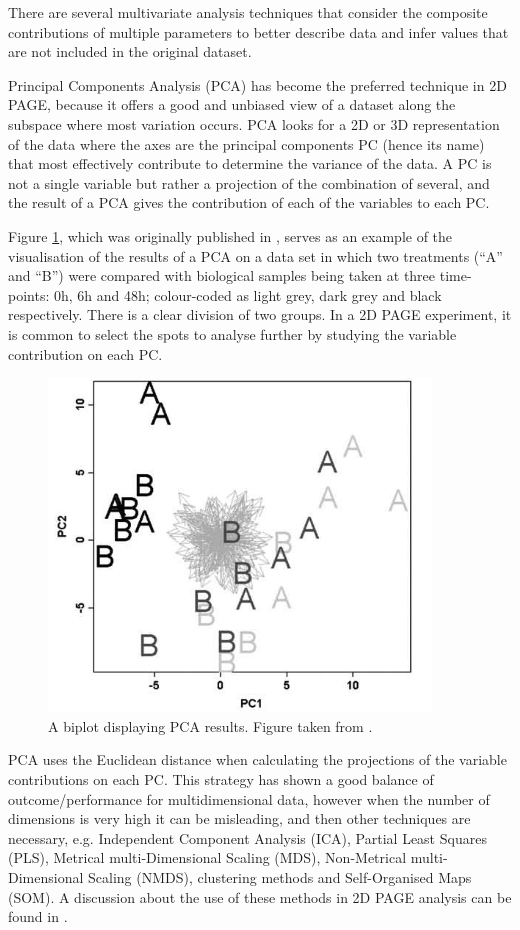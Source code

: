 There are several multivariate analysis techniques that consider the composite contributions of multiple parameters to better describe data and infer values that are not included in the original dataset.

Principal Components Analysis (PCA) has become the preferred technique in 2D PAGE, because it offers a good and unbiased view of a dataset along the subspace where most variation occurs. PCA looks for a 2D or 3D representation of the data where the axes are the principal components PC (hence its name) that most effectively contribute to determine the variance of the data. A PC is not a single variable but rather a projection of the combination of several, and the result of a PCA gives the contribution of each of the variables to each PC.

Figure \ref{fig:PCA}, which was originally published in \cite{SIL2014}, serves as an example of the visualisation of the results of a PCA on a data set in which two treatments (``A'' and ``B'') were compared with biological samples being taken at three time-points: 0h, 6h and 48h; colour-coded as light grey, dark grey and black respectively. There is a clear division of two groups. In a 2D PAGE experiment, it is common to select the spots to analyse further by studying the variable contribution on each PC.

\begin{figure}  
\centering
\includegraphics[width=4in]{figures/PCA.png}
\caption[Example of a PCA result plot.]{A biplot displaying PCA results. Figure taken from \cite{SIL2014}. 
\label{fig:PCA}}
\end{figure}

PCA uses the Euclidean distance when calculating the projections of the variable contributions on each PC. This strategy has shown a good balance of outcome/performance for multidimensional data, however when the number of dimensions is very high it can be misleading, and then other techniques are necessary, e.g. Independent Component Analysis (ICA), Partial Least Squares (PLS), Metrical multi-Dimensional Scaling (MDS), Non-Metrical multi-Dimensional Scaling (NMDS), clustering methods and Self-Organised Maps (SOM). A discussion about the use of these methods in 2D PAGE analysis can be found in \cite{SIL2014}.



